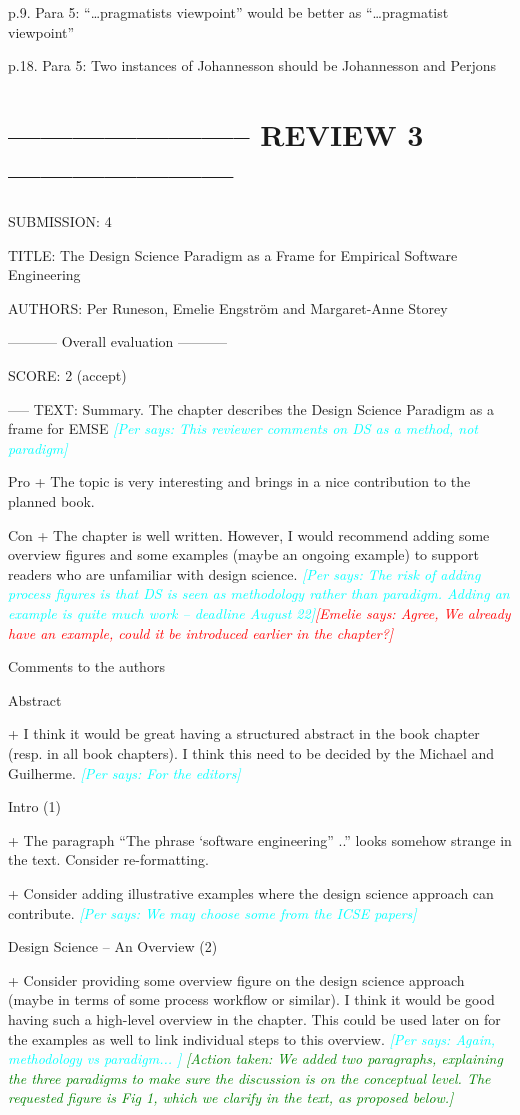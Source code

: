\documentclass{article}
\newcommand{\emelie}[1]{\textcolor{red}{{\it [Emelie says: #1]}}}
\newcommand{\per}[1]{\textcolor{cyan}{{\it [Per says: #1]}}}
\newcommand{\action}[1]{\textcolor{green}{{\it [Action taken: #1]}}}
\newcommand{\emelie}[1]{}
\newcommand{\per}[1]{}
\newcommand{\action}[1]{}
\begin{document}
p.9. Para 5: “…pragmatists viewpoint” would be better as “…pragmatist viewpoint”
 
p.18. Para 5: Two instances of Johannesson should be Johannesson and Perjons



\section*{----------------------- REVIEW 3 ---------------------}
SUBMISSION: 4

TITLE: The Design Science Paradigm as a Frame for Empirical Software Engineering

AUTHORS: Per Runeson, Emelie Engström and Margaret-Anne Storey

----------- Overall evaluation -----------

SCORE: 2 (accept)

----- TEXT:
Summary. The chapter describes the Design Science Paradigm as a frame for EMSE 
\per{This reviewer comments on DS as a method, not paradigm}

Pro
+ The topic is very interesting and brings in a nice contribution to the planned book.

Con
+ The chapter is well written. However, I would recommend adding some overview figures and some examples (maybe an ongoing example) to support readers who are unfamiliar with design science. \per{The risk of adding process figures is that DS is seen as methodology rather than paradigm. Adding an example is quite much work -- deadline August 22}\emelie{Agree, We already have an example, could it be introduced earlier in the chapter?}

Comments to the authors

Abstract

+ I think it would be great having a structured abstract in the book chapter (resp. in all book chapters). I think this need to be decided by the Michael and Guilherme. \per{For the editors}

Intro (1)

+ The paragraph “The phrase ‘software engineering” ..” looks somehow strange in the text. Consider re-formatting.

+ Consider adding illustrative examples where the design science approach can contribute. \per{We may choose some from the ICSE papers}

Design Science – An Overview (2)

+ Consider providing some overview figure on the design science approach (maybe in terms of some process workflow or similar). I think it would be good having such a high-level overview in the chapter. This could be used later on for the examples as well to link individual steps to this overview. \per{Again, methodology vs paradigm... }
\action{We added two paragraphs, explaining the three paradigms to make sure the discussion is on the conceptual level. The requested figure is Fig 1, which we clarify in the text, as proposed below.}
\end{document}
